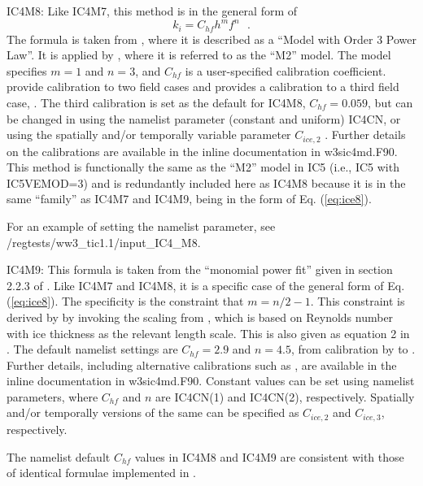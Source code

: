 {\code IC4M8}: Like {\code IC4M7}, this method is in the general form of 
\begin{equation}\label{eq:ice8}
  {k_i=C_{hf}h^mf^n} \:\:\: .
\end{equation}
The formula is taken from \cite{Meylan2018}, where it is described as a ``Model with Order 3 Power Law''. It is applied by \cite{Liu2020}, where it is referred to as the ``M2'' model. The model specifies $m=1$ and $n=3$, and $C_{hf}$ is a user-specified calibration coefficient. \cite{Liu2020} provide calibration to two field cases and \cite{rep:RYW2021} provides a calibration to a third field case, \cite{art:RMK2021}. The third calibration is set as the default for {\code IC4M8}, $C_{hf}=0.059$, but can be changed in using the namelist parameter (constant and uniform) {\code IC4CN}, or using the spatially and/or temporally variable parameter  ${C_{ice,2}}$ . Further details on the calibrations are available in the inline documentation in {\file w3sic4md.F90}.  This method is functionally the same as the ``{\code M2}'' model in {\code IC5} (i.e., {\code IC5} with {\code IC5VEMOD=3}) and is redundantly included here as {\code IC4M8} because it is in the same ``family'' as {\code IC4M7} and {\code IC4M9}, being in the form of Eq. (\ref{eq:ice8}). 

For an example of setting the namelist parameter, see {\file /regtests/ww3\_tic1.1/input\_IC4\_M8}.

{\code IC4M9}: This formula is taken from the ``monomial power fit'' given in section 2.2.3 of \cite{rep:RYW2021}. Like {\code IC4M7} and {\code IC4M8}, it is a specific case of the general form of Eq. (\ref{eq:ice8}). The specificity is the constraint that $m=n/2-1$. This constraint is derived by \cite{rep:RYW2021} by invoking the scaling from \cite{art:YRW2019}, which is based on Reynolds number with ice thickness as the relevant length scale. This is also given as equation 2 in \cite{art:YRW2022}. The default namelist settings are $C_{hf}=2.9$ and $n=4.5$, from calibration by \cite{rep:RYW2021} to  \cite{art:RMK2021}. Further details, including alternative calibrations such as \cite{art:Yu2022}, are available in the inline documentation in {\file w3sic4md.F90}. Constant values can be set using namelist parameters, where $C_{hf}$ and $n$ are {\code IC4CN(1)} and {\code IC4CN(2)}, respectively. Spatially and/or temporally versions of the same can be specified as ${C_{ice,2}}$ and ${C_{ice,3}}$, respectively.

The namelist default $C_{hf}$ values in {\code IC4M8} and {\code IC4M9} are consistent with those of identical formulae implemented in \cite{man:SWAN4145A}.

  
